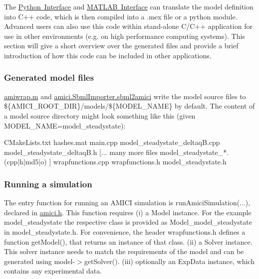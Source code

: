 The \mbox{\hyperlink{python_interface}{Python Interface}} and \mbox{\hyperlink{matlab_interface}{M\+A\+T\+L\+AB Interface}} can translate the model definition into C++ code, which is then compiled into a .mex file or a python module. Advanced users can also use this code within stand-\/alone C/\+C++ application for use in other environments (e.\+g. on high performance computing systems). This section will give a short overview over the generated files and provide a brief introduction of how this code can be included in other applications.

\subsubsection*{Generated model files}

{\ttfamily \mbox{\hyperlink{amiwrap_8m}{amiwrap.\+m}}} and {\ttfamily \mbox{\hyperlink{classamici_1_1sbml__import_1_1_sbml_importer_ae5cdd2444bac89e61e6f717f7736acb6}{amici.\+Sbml\+Importer.\+sbml2amici}}} write the model source files to \$\{A\+M\+I\+C\+I\+\_\+\+R\+O\+O\+T\+\_\+\+D\+IR\}/models/\$\{M\+O\+D\+E\+L\+\_\+\+N\+A\+ME\} by default. The content of a model source directory might look something like this (given {\ttfamily M\+O\+D\+E\+L\+\_\+\+N\+A\+ME=model\+\_\+steadystate})\+:


\begin{DoxyCode}
CMakeLists.txt
hashes.mat 
main.cpp 
model\_steadystate\_deltaqB.cpp 
model\_steadystate\_deltaqB.h 
[... many more files model\_steadystate\_*.(cpp|h|md5|o) ]
wrapfunctions.cpp 
wrapfunctions.h 
model\_steadystate.h 
\end{DoxyCode}


\subsubsection*{Running a simulation}

The entry function for running an A\+M\+I\+CI simulation is {\ttfamily run\+Amici\+Simulation(...)}, declared in \mbox{\hyperlink{amici_8h_source}{amici.\+h}}. This function requires (i) a {\ttfamily Model} instance. For the example {\ttfamily model\+\_\+steadystate} the respective class is provided as {\ttfamily Model\+\_\+model\+\_\+steadystate} in {\ttfamily model\+\_\+steadystate.\+h}. For convenience, the header {\ttfamily wrapfunctions.\+h} defines a function {\ttfamily get\+Model()}, that returns an instance of that class. (ii) a {\ttfamily Solver} instance. This solver instance needs to match the requirements of the model and can be generated using {\ttfamily model-\/$>$get\+Solver()}. (iii) optionally an {\ttfamily Exp\+Data} instance, which contains any experimental data.

